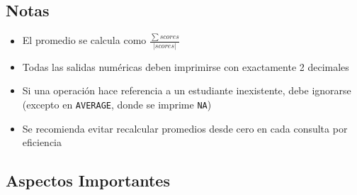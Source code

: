 \documentclass[11pt,a4paper]{article}
\begin{document}
\subsection*{Notas}

\begin{itemize}
    \item El promedio se calcula como $\frac{\sum scores}{|scores|}$
    \item Todas las salidas numéricas deben imprimirse con exactamente 2 decimales
    \item Si una operación hace referencia a un estudiante inexistente, debe ignorarse (excepto en \texttt{AVERAGE}, donde se imprime \texttt{NA})
    \item Se recomienda evitar recalcular promedios desde cero en cada consulta por eficiencia
\end{itemize}

\subsection*{Aspectos Importantes}
\end{document}
